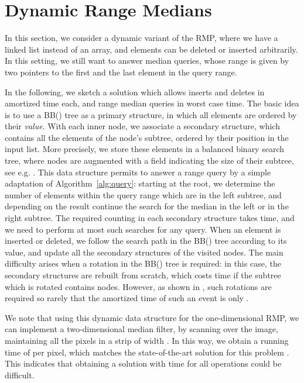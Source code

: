 \documentclass[a4paper,10pt]{article}
\begin{document}
\section{Dynamic Range Medians}
\label{s:dynamic}


In this section, we consider a dynamic variant of the RMP,
where we have a linked list instead of an array,
and elements can be deleted or inserted arbitrarily.
In this setting, we still want to answer median queries, whose range is given by two pointers to the first and the last
element in the query range. 

In the following, we sketch a solution which allows  inserts and deletes   in  amortized time each, and range median queries in  worst case time. 
The basic idea is to use a BB() tree \cite{DBLP:conf/stoc/NievergeltR72} as a primary structure, in which all elements are ordered by their \emph{value}.
With each inner node, we associate a secondary structure, which contains all the elements of the node's subtree, ordered by their position in the input list.
More precisely, we store these elements in a balanced binary search tree, where nodes are augmented with a field indicating the size of their subtree, see e.g. \cite{DBLP:conf/icalp/Roura01}. 
This data structure permits to answer a range query by a simple adaptation of Algorithm~\ref{alg:query}: starting at the root,
we determine the number of elements within the query range which are in the left subtree, and depending on the result continue the search for the median in the left or in the right subtree. The required counting in each secondary structure takes  time, and we need to perform at most  such searches for any query.
When an element is inserted or deleted, we follow the search path in the BB() tree according to its value, and update all the  secondary structures of the visited nodes. 
The main difficulty arises when a rotation in the BB() tree is required: in this case, the secondary structures are rebuilt from scratch, which costs  time if the subtree which is rotated contains  nodes. 
However, as shown in \cite{mehlhornsbook,luekerwillard}, such rotations are required so rarely that 
the amortized time of such an event is only .


We note that using this dynamic data structure for the one-dimensional RMP, we can implement a two-dimensional median filter, by scanning over the image, maintaining all the pixels in a strip of width . In this way, we obtain a running time of  per pixel, which matches the state-of-the-art solution for this problem \cite{GilWerman}.
This indicates that obtaining a solution with  time for all operations could be difficult.
\end{document}
